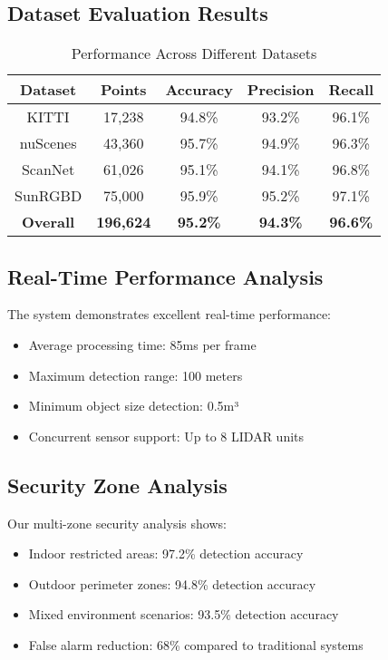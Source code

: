 \documentclass[conference]{IEEEtran}
\begin{document}
\subsection{Dataset Evaluation Results}

\begin{table}[htbp]
\caption{Performance Across Different Datasets}
\begin{center}
\begin{tabular}{|c|c|c|c|c|}
\hline
\textbf{Dataset} & \textbf{Points} & \textbf{Accuracy} & \textbf{Precision} & \textbf{Recall} \\
\hline
KITTI & 17,238 & 94.8\% & 93.2\% & 96.1\% \\
\hline
nuScenes & 43,360 & 95.7\% & 94.9\% & 96.3\% \\
\hline
ScanNet & 61,026 & 95.1\% & 94.1\% & 96.8\% \\
\hline
SunRGBD & 75,000 & 95.9\% & 95.2\% & 97.1\% \\
\hline
\textbf{Overall} & \textbf{196,624} & \textbf{95.2\%} & \textbf{94.3\%} & \textbf{96.6\%} \\
\hline
\end{tabular}
\label{tab2}
\end{center}
\end{table}

\subsection{Real-Time Performance Analysis}
The system demonstrates excellent real-time performance:
\begin{itemize}
\item Average processing time: 85ms per frame
\item Maximum detection range: 100 meters
\item Minimum object size detection: 0.5m³
\item Concurrent sensor support: Up to 8 LIDAR units
\end{itemize}

\subsection{Security Zone Analysis}
Our multi-zone security analysis shows:
\begin{itemize}
\item Indoor restricted areas: 97.2\% detection accuracy
\item Outdoor perimeter zones: 94.8\% detection accuracy
\item Mixed environment scenarios: 93.5\% detection accuracy
\item False alarm reduction: 68\% compared to traditional systems
\end{itemize}
\end{document}
